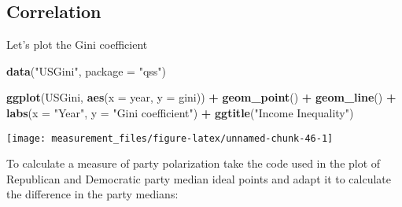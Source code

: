 \documentclass[]{book}
\newenvironment{Shaded}{\begin{snugshade}}{\end{snugshade}}
\newcommand{\DataTypeTok}[1]{\textcolor[rgb]{0.13,0.29,0.53}{#1}}
\newcommand{\KeywordTok}[1]{\textcolor[rgb]{0.13,0.29,0.53}{\textbf{#1}}}
\newcommand{\NormalTok}[1]{#1}
\newcommand{\OperatorTok}[1]{\textcolor[rgb]{0.81,0.36,0.00}{\textbf{#1}}}
\newcommand{\StringTok}[1]{\textcolor[rgb]{0.31,0.60,0.02}{#1}}
\theoremstyle{definition}
\theoremstyle{definition}
\theoremstyle{definition}
\theoremstyle{remark}
\begin{document}
\hypertarget{correlation}{%
\subsection{Correlation}\label{correlation}}

Let's plot the Gini coefficient

\begin{Shaded}
\begin{Highlighting}[]
\KeywordTok{data}\NormalTok{(}\StringTok{"USGini"}\NormalTok{, }\DataTypeTok{package =} \StringTok{"qss"}\NormalTok{)}
\end{Highlighting}
\end{Shaded}

\begin{Shaded}
\begin{Highlighting}[]
\KeywordTok{ggplot}\NormalTok{(USGini, }\KeywordTok{aes}\NormalTok{(}\DataTypeTok{x =}\NormalTok{ year, }\DataTypeTok{y =}\NormalTok{ gini)) }\OperatorTok{+}
\StringTok{  }\KeywordTok{geom_point}\NormalTok{() }\OperatorTok{+}
\StringTok{  }\KeywordTok{geom_line}\NormalTok{() }\OperatorTok{+}
\StringTok{  }\KeywordTok{labs}\NormalTok{(}\DataTypeTok{x =} \StringTok{"Year"}\NormalTok{, }\DataTypeTok{y =} \StringTok{"Gini coefficient"}\NormalTok{) }\OperatorTok{+}
\StringTok{  }\KeywordTok{ggtitle}\NormalTok{(}\StringTok{"Income Inequality"}\NormalTok{)}
\end{Highlighting}
\end{Shaded}

\begin{center}\texttt{[image: measurement\_files/figure-latex/unnamed-chunk-46-1]} \end{center}

To calculate a measure of party polarization take the code used in the
plot of Republican and Democratic party median ideal points and adapt it
to calculate the difference in the party medians:
\end{document}
